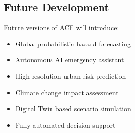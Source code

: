 
\subsection{Future Development}

Future versions of ACF will introduce:

\begin{itemize}

\item Global probabilistic hazard forecasting

\item Autonomous AI emergency assistant

\item High-resolution urban risk prediction

\item Climate change impact assessment

\item Digital Twin based scenario simulation

\item Fully automated decision support

\end{itemize}


